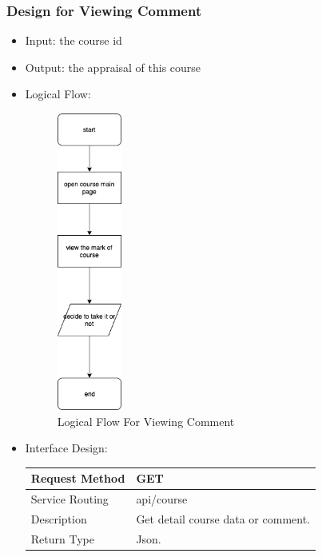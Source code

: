 \documentclass[16pt]{scrreprt}
\begin{document}
\subsubsection{Design for Viewing Comment}
\begin{itemize}
    \item Input: the course id
    \item Output: the appraisal of this course
    \item Logical Flow:
    \begin{figure}[H]
        \centering
        \includegraphics[width=0.2\textwidth]{diagrams/flow-ViewMark.png}
        \caption{Logical Flow For Viewing Comment}
    \end{figure}
    \item Interface Design: 
    \begin{center}
        \begin{tabular}{p{5cm}p{10cm}}
            \hline
            Request Method & GET\\
            \hline
            Service Routing &  api/course\\
            \hline
            Description & Get detail course data or comment.\\
            \hline
            Return Type & Json.\\
            \hline
        \end{tabular}
    \end{center}
\end{itemize}
\end{document}
